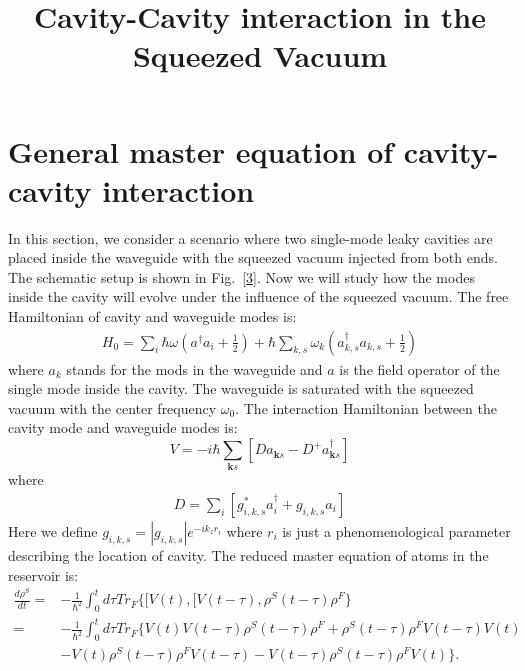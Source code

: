 \documentclass{article}
\let\vec\bm
\begin{document}
\title{Cavity-Cavity interaction in the Squeezed Vacuum}
\maketitle 





\section{General master equation of cavity-cavity interaction}
In this section, we consider a scenario where two single-mode leaky cavities are placed inside the waveguide with the squeezed vacuum injected from both ends. The schematic setup is shown in Fig.~\ref{3}. Now we will study how the modes inside the cavity will evolve under the influence of the squeezed vacuum. The free Hamiltonian of cavity and waveguide modes is:
\begin{equation}
\label{eq5a}
\begin{split}
H_{0}=\sum_{i}\hbar\omega(a^{\dagger}a_{i}+\frac{1}{2})+\hbar\sum_{k,s}\omega_{k}(a_{k,s}^{\dagger}a_{k,s}+\frac{1}{2})
\end{split}
\end{equation}
where $a_k$ stands for the mods in the waveguide and $a$ is the field operator of the single mode inside the cavity. The waveguide is saturated with the squeezed vacuum with the center frequency $\omega_0$.  The interaction Hamiltonian between the cavity mode and waveguide modes is:
\begin{equation}
\label{eqa0}
V=-i\hbar\sum_{\vec{k}s}[Da_{\vec{k}s}-D^{+}a_{\vec{k}s}^{\dagger}]
\end{equation}
where
\begin{equation}
\label{eqa1}
\begin{gathered}
 D=\underset{i}{\sum}[g_{i,k,s}^{*}a_{i}^{\dagger}+g_{i,k,s}a_{i}]
\end{gathered}
\end{equation}
Here we define $g_{i,k,s}=|g_{i,k,s}|e^{-ik_z r_i}$ where $r_i$ is just a phenomenological parameter describing the location of cavity. The reduced master equation of atoms in the reservoir is:
\begin{equation}
\label{eqa2}
\begin{split}
\frac{d\rho^{S}}{dt}=&-\frac{1}{\hbar^{2}}\int_{0}^{t}d\tau Tr_{F}\{[V(t),[V(t-\tau),\rho^{S}(t-\tau)\rho^{F}\}\\
=&-\frac{1}{\hbar^{2}}\int_{0}^{t}d\tau Tr_{F}\{V(t)V(t-\tau)\rho^{S}(t-\tau)\rho^{F}+\rho^{S}(t-\tau)\rho^{F}V(t-\tau)V(t)\\
&-V(t)\rho^{S}(t-\tau)\rho^{F}V(t-\tau)-V(t-\tau)\rho^{S}(t-\tau)\rho^{F}V(t)\}.
\end{split}
\end{equation} 
\end{document}
